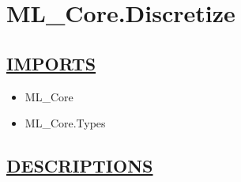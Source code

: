 \chapter*{ML\_Core.Discretize}
\hypertarget{ecldoc:toc:ML_Core.Discretize}{}

\section*{\underline{IMPORTS}}
\begin{itemize}
\item ML\_Core
\item ML\_Core.Types
\end{itemize}

\section*{\underline{DESCRIPTIONS}}
